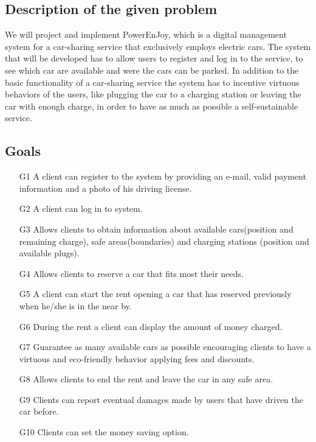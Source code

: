 
\subsection{Description of the given problem}
We will project and implement PowerEnJoy, which is a digital management system for a car-sharing service that exclusively employs electric cars.
The system that will be developed has to allow users to register and log in to the service, to see which car are available and were the cars can be parked. In addition to the basic functionality of a car-sharing service the system has to incentive virtuous behaviors of the users, like plugging the car to a charging station or leaving the car with enough charge, in order to have as much as possible a self-sustainable service.

\subsection{Goals}

\begin{itemize}
\item [G1]A client can register to the system by providing an e-mail, valid payment information and a photo of his driving license.

\item [G2]A client can log in to system.

\item [G3]Allows clients to obtain information about available cars(position and remaining charge), safe areas(boundaries) and charging stations (position and available plugs).

\item [G4]Allows clients to reserve a car that fits most their needs.

\item [G5]A client can start the rent opening a car that has reserved previously when he/she is in the near by.

\item [G6]During the rent a client can display the amount of money charged.

\item [G7]Guarantee as many available cars as possible encouraging clients to have a virtuous and eco-friendly behavior applying fees and discounts.

\item [G8]Allows clients to end the rent and leave the car in any safe area.

\item [G9]Clients can report eventual damages made by users that have driven the car before.

\item [G10]Clients can set the money saving option.


\end{itemize}


